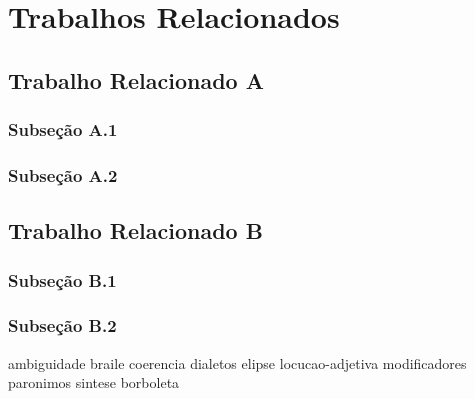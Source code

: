 \chapter{Trabalhos Relacionados}
\label{ch:trabalhos-relacionados}

\section{Trabalho Relacionado A}
\label{sec:trabalhos-relacionado-a}

\subsection{Subseção A.1}
\label{subsec:subsecao-a.13}

\subsection{Subseção A.2}
\label{subsec:subsecao-a.23}

\section{Trabalho Relacionado B}
\label{sec:trabalhos-relacionado-b}

\subsection{Subseção B.1}
\label{subsec:subsecao-b.13}

\subsection{Subseção B.2}
\label{subsec:subsecao-b.23}

\Gls{ambiguidade}
\Gls{braile}
\Gls{coerencia}
\Gls{dialetos}
\Gls{elipse}
\Gls{locucao-adjetiva}
\Gls{modificadores}
\Gls{paronimos}
\Gls{sintese}
\Gls{borboleta}